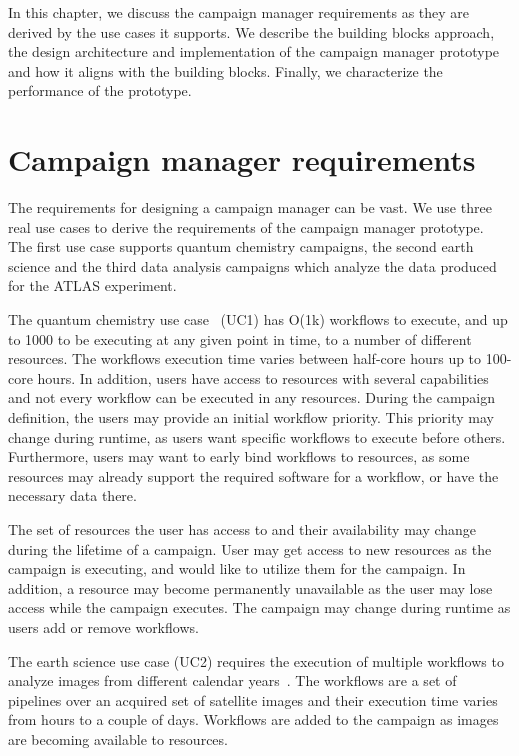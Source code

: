 In this chapter, we discuss the campaign manager requirements as they are derived by the use cases it supports.
We describe the building blocks approach, the design architecture and implementation of the campaign manager prototype and how it aligns with the building blocks.
Finally, we characterize the performance  of the prototype.

\section{Campaign manager requirements}
The requirements for designing a campaign manager can be vast.
We use three real use cases to derive the requirements of the campaign manager prototype.
The first use case supports quantum chemistry campaigns, the second earth science and the third data analysis campaigns which analyze the data produced for the ATLAS experiment.

The quantum chemistry use case~\cite{smith2020molssi} (UC1) has O(1k) workflows to execute, and up to 1000 to be executing at any given point in time, to a number of different resources. 
The workflows execution time varies between half-core hours up to 100-core hours.
In addition, users have access to resources with several capabilities and not every workflow can be executed in any resources. 
During the campaign definition, the users may provide an initial workflow priority.
This priority may change during runtime, as users want specific workflows to execute before others.
Furthermore, users may want to early bind workflows to resources, as some resources may already support the required software for a workflow, or have the necessary data there.

The set of resources the user has access to and their availability may change during the lifetime of a campaign.
User may get access to new resources as the campaign is executing, and would like to utilize them for the campaign.
In addition, a resource may become permanently unavailable as the user may lose access while the campaign executes.
The campaign may change during runtime as users add or remove workflows.

The earth science use case (UC2) requires the execution of multiple workflows to analyze images from different calendar years~\cite{paraskevakos2019workflow}.
The workflows are a set of pipelines over an acquired set of satellite images and their execution time varies from hours to a couple of days.
Workflows are added to the campaign as images are becoming available to resources.

